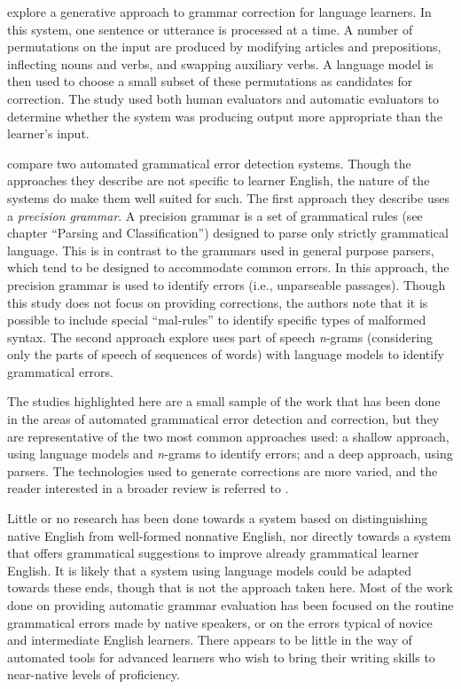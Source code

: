 \documentclass[main.tex]{subfiles}
\begin{document}
\citet{lee:2006} explore a generative approach to grammar correction for language learners. In this system, one sentence or utterance is processed at a time. A number of permutations on the input are produced by modifying articles and prepositions, inflecting nouns and verbs, and swapping auxiliary verbs. A language model is then used to choose a small subset of these permutations as candidates for correction. The study used both human evaluators and automatic evaluators to determine whether the system was producing output more appropriate than the learner's input.

\citet{wagner:2007} compare two automated grammatical error detection systems. Though the approaches they describe are not specific to learner English, the nature of the systems do make them well suited for such. The first approach they describe uses a \textit{precision grammar}. A precision grammar is a set of grammatical rules (see chapter ``Parsing and Classification'') designed to parse only strictly grammatical language. This is in contrast to the grammars used in general purpose parsers, which tend to be designed to accommodate common errors. In this approach, the precision grammar is used to identify errors (i.e., unparseable passages). Though this study does not focus on providing corrections, the authors note that it is possible to include special ``mal-rules'' to identify specific types of malformed syntax. The second approach \citeauthor{wagner:2007} explore uses part of speech \textit{n}-grams (considering only the parts of speech of sequences of words) with language models to identify grammatical errors.

The studies highlighted here are a small sample of the work that has been done in the areas of automated grammatical error detection and correction, but they are representative of the two most common approaches used: a shallow approach, using language models and \textit{n}-grams to identify errors; and a deep approach, using parsers. The technologies used to generate corrections are more varied, and the reader interested in a broader review is referred to \citet{lee:2009}.

Little or no research has been done towards a system based on distinguishing native English from well-formed nonnative English, nor directly towards a system that offers grammatical suggestions to improve already grammatical learner English. It is likely that a system using language models could be adapted towards these ends, though that is not the approach taken here. Most of the work done on providing automatic grammar evaluation has been focused on the routine grammatical errors made by native speakers, or on the errors typical of novice and intermediate English learners. There appears to be little in the way of automated tools for advanced learners who wish to bring their writing skills to near-native levels of proficiency.


\biblio
\end{document}

